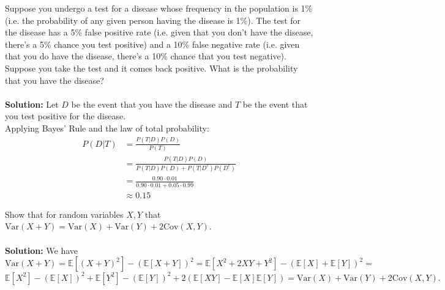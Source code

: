 \documentclass{harvardml}
\theoremstyle{definition}
\theoremstyle{plain}
\newcommand{\E}{\mathbb{E}}
\newcommand{\var}{\text{Var}}
\newcommand{\cov}{\text{Cov}}
\begin{document}
\begin{problem}
    Suppose you undergo a test for a disease  whose frequency in the population is 1\% (i.e. the probability of any given person having the disease is 1\%). The test for the disease has a 5\% false positive rate (i.e. given that you don't have the disease, there's a 5\% chance you test positive) and a 10\% false negative rate (i.e. given that you do have the disease, there's a 10\% chance that you test negative). Suppose you take the test and it comes back positive. What is the probability that you have the disease? 
    \\
    \\
    \noindent \textbf{Solution:} 
    Let $D$ be the event that you have the disease and $T$ be the event that you test positive for the disease.
    \\
    Applying Bayes' Rule and the law of total probability:
    \begin{align*}
        P(D|T) &= \frac{P(T|D)P(D)}{P(T)} \\
        &= \frac{P(T|D)P(D)}{P(T|D)P(D) + P(T|D^c)P(D^c)} \\
        &= \frac{0.90 \cdot 0.01}{0.90 \cdot 0.01 + 0.05 \cdot 0.99} \\
        &\approx 0.15
    \end{align*}
\end{problem}





\begin{problem}
    Show that for random variables $X, Y$ that $\var(X+Y) = \var(X) + \var(Y) + 2\cov(X, Y)$.
    \\
    \\
    \textbf{Solution:} We have
    $$
    \var(X+Y) = \E[(X+Y)^2] - (\E[X+Y])^2 = \E[X^2 + 2XY + Y^2] - (\E[X]+\E[Y])^2 = $$ $$ \E[X^2]-(\E[X])^2 + \E[Y^2]-(\E[Y])^2 + 2(\E[XY]-\E[X]\E[Y]) = \var(X) + \var(Y) + 2\cov(X, Y)
    .$$
    \end{problem}
    
\end{document}
